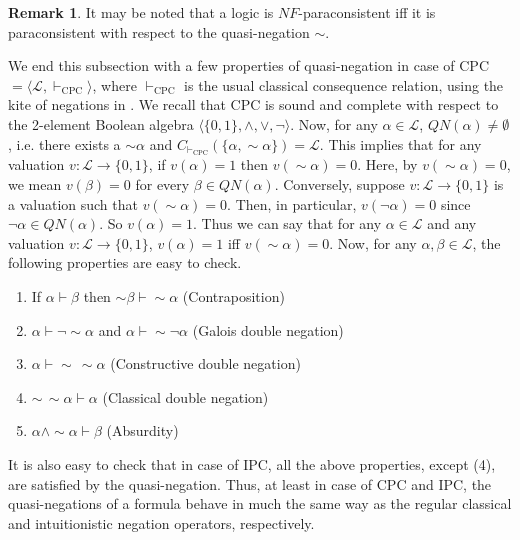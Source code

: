 \documentclass[submission]{eptcs}
\newcommand{\lang}{\mathcal{L}}
\newcommand{\qneg}{\sim\!}
\theoremstyle{definition}
\newtheorem{rem}[thm]{Remark}
\begin{document}
\begin{rem}
It may be noted that a logic is $NF$-paraconsistent iff it is paraconsistent with respect to the quasi-negation $\qneg$.
\end{rem}

We end this subsection with a few properties of quasi-negation in case of CPC $=\langle\lang,\vdash_{\mathrm{CPC}}\rangle$, where $\vdash_{\mathrm{CPC}}$ is the usual classical consequence relation, using the kite of negations in \cite{Dunn1999}. We recall that CPC is sound and complete with respect to the 2-element Boolean algebra $\langle\{0,1\},\land,\lor,\neg\rangle$. Now, for any $\alpha\in\lang$, $QN(\alpha)\neq\emptyset$, i.e. there exists a $\qneg\alpha$ and $C_{\vdash_{\mathrm{CPC}}}(\{\alpha,\qneg\alpha\})=\lang$. This implies that for any valuation $v:\lang\to\{0,1\}$, if $v(\alpha)=1$ then $v(\qneg\alpha)=0$. Here, by $v(\qneg\alpha)=0$, we mean $v(\beta)=0$ for every $\beta\in QN(\alpha)$. Conversely, suppose $v:\lang\to\{0,1\}$ is a valuation such that $v(\qneg\alpha)=0$. Then, in particular, $v(\neg\alpha)=0$ since $\neg\alpha\in QN(\alpha)$. So $v(\alpha)=1$. Thus we can say that for any $\alpha\in\lang$  and any valuation $v:\lang\to\{0,1\}$, $v(\alpha)=1$ iff $v(\qneg\alpha)=0$. Now, for any $\alpha,\beta\in\lang$, the following properties are easy to check.

\begin{enumerate}[label=(\arabic*)]
    \item If $\alpha\vdash\beta$ then $\qneg\beta\vdash\qneg\alpha$ (Contraposition)
    \item $\alpha\vdash\neg\qneg\alpha$ and $\alpha\vdash\qneg\neg\alpha$ (Galois double negation)
    \item $\alpha\vdash\qneg\,\qneg\alpha$ (Constructive double negation)
    \item $\qneg\,\qneg\alpha\vdash\alpha$ (Classical double negation)
    \item $\alpha\land\qneg\alpha\vdash\beta$ (Absurdity)
\end{enumerate}

It is also easy to check that in case of IPC, all the above properties, except (4), are satisfied by the quasi-negation. Thus, at least in case of CPC and IPC, the quasi-negations of a formula behave in much the same way as the regular classical and intuitionistic negation operators, respectively.
\end{document}
